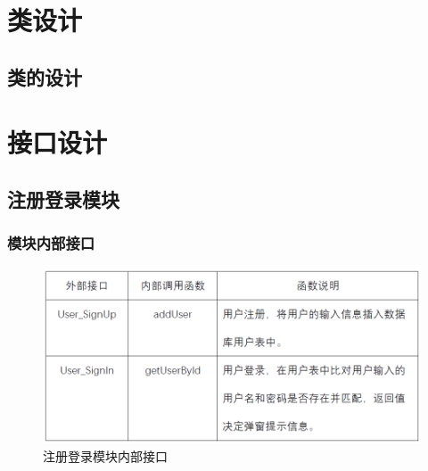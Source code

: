 \section{类设计}
\subsection{类的设计}

\section{接口设计}
\subsection{注册登录模块}
\subsubsection{模块内部接口}
\begin{figure}[!htbp]
	\centering
	\includegraphics[scale=0.7]{image/b1.png} %
	\caption{注册登录模块内部接口} %
\end{figure}
